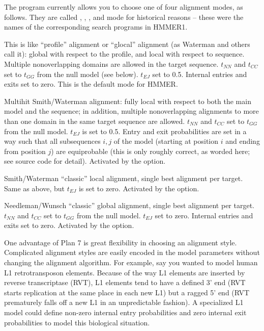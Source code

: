 The  program currently allows you to choose one of four
alignment modes, as follows. They are called ,
, , and  mode for historical
reasons -- these were the names of the corresponding search programs
in HMMER1.

\begin{wideitem}
\item [\emprog{hmmls}] This is like ``profile'' alignment or
``glocal'' alignment (as Waterman and others call it): global with
respect to the profile, and local with respect to sequence.  Multiple
nonoverlapping domains are allowed in the target sequence. $t_{NN}$
and $t_{CC}$ set to $t_{GG}$ from the null model (see below). $t_{EJ}$
set to 0.5. Internal entries and exits set to zero. This is the
default mode for HMMER.

\item [\emprog{hmmfs}] Multihit Smith/Waterman alignment: fully local
with respect to both the main model and the sequence; in addition,
multiple nonoverlapping alignments to more than one domain in the same
target sequence are allowed.  $t_{NN}$ and $t_{CC}$ set to $t_{GG}$
from the null model.  $t_{EJ}$ is set to 0.5.  Entry and exit
probabilities are set in a way such that all subsequences $i,j$ of the
model (starting at position $i$ and ending from position $j$) are
equiprobable (this is only roughly correct, as worded here; see source
code for detail). Activated by the  option.

\item [\emprog{hmmsw}] Smith/Waterman ``classic'' local alignment,
single best alignment per target. Same as  above, but
$t_{EJ}$ is set to zero. Activated by the  option.

\item [\emprog{hmms}] Needleman/Wunsch ``classic'' global alignment,
single best alignment per target. $t_{NN}$ and $t_{CC}$ set to
$t_{GG}$ from the null model. $t_{EJ}$ set to zero. Internal entries
and exits set to zero.  Activated by the  option.
\end{wideitem}

One advantage of Plan 7 is great flexibility in choosing an alignment
style. Complicated alignment styles are easily encoded in the model
parameters without changing the alignment algorithm.  For example, say
you wanted to model human L1 retrotransposon elements. Because of the
way L1 elements are inserted by reverse transcriptase (RVT), L1
elements tend to have a defined 3' end (RVT starts replication at the
same place in each new L1) but a ragged 5' end (RVT prematurely falls
off a new L1 in an unpredictable fashion). A specialized L1 model
could define non-zero internal entry probabilities and zero internal
exit probabilities to model this biological situation.

